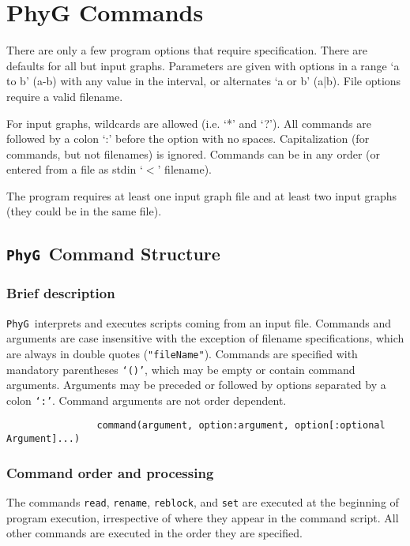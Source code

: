 \documentclass[11pt]{book}
\newcommand{\phyg}{\texttt{PhyG }}
\begin{document}
\chapter{PhyG Commands}
	There are only a few program options that require specification.  There are defaults for all but input
	graphs.  Parameters are given with options in a range `a to b' (a-b) with any value in the interval, or
	alternates `a or b' (a|b). File options require a valid filename.
	
	For input graphs, wildcards are allowed (i.e. `*' and `?').  All commands are followed by a colon `:' 
	before the option with no spaces.  
	Capitalization (for commands, but not filenames) is ignored.  Commands can be in any order 
	(or entered from a file as stdin `$<$' filename).
	
	The program requires at least one input graph file and at least two input graphs (they could be in the same file).

\section{\phyg Command Structure}
		
	\subsection{Brief description}
		\phyg interprets and executes scripts coming from an input file. Commands and arguments are case 
		insensitive with the exception of filename specifications, which are always in double quotes (\texttt{"fileName"}).  
		Commands are specified with mandatory parentheses \texttt{`()'}, which may be empty or contain 
		command arguments. Arguments may be preceded or followed by options separated 
		by a colon \texttt{`:'}.  Command arguments are not order dependent.

			\begin{verbatim}
				command(argument, option:argument, option[:optional Argument]...)
			\end{verbatim}
	
		\subsection{Command order and processing}
		The commands \texttt{read}, \texttt{rename}, \texttt{reblock}, and \texttt{set} are executed at
		the beginning of program execution, irrespective of where they appear in the command script.  
		All other commands are executed in the order they are specified.
\end{document}
